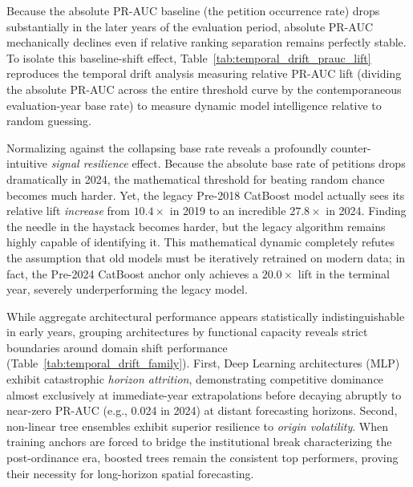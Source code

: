 \documentclass[11pt, letterpaper, oneside]{article}
\begin{document}
\vspace{1em}


\noindent Because the absolute PR-AUC baseline (the petition occurrence rate) drops substantially in the later years of the evaluation period, absolute PR-AUC mechanically declines even if relative ranking separation remains perfectly stable. To isolate this baseline-shift effect, Table~\ref{tab:temporal_drift_prauc_lift} reproduces the temporal drift analysis measuring relative PR-AUC lift (dividing the absolute PR-AUC across the entire threshold curve by the contemporaneous evaluation-year base rate) to measure dynamic model intelligence relative to random guessing.



Normalizing against the collapsing base rate reveals a profoundly counter-intuitive \textit{signal resilience} effect. Because the absolute base rate of petitions drops dramatically in 2024, the mathematical threshold for beating random chance becomes much harder. Yet, the legacy Pre-2018 CatBoost model actually sees its relative lift \textit{increase} from $10.4\times$ in 2019 to an incredible $27.8\times$ in 2024. Finding the needle in the haystack becomes harder, but the legacy algorithm remains highly capable of identifying it. This mathematical dynamic completely refutes the assumption that old models must be iteratively retrained on modern data; in fact, the Pre-2024 CatBoost anchor only achieves a $20.0\times$ lift in the terminal year, severely underperforming the legacy model.

\vspace{1em}
While aggregate architectural performance appears statistically indistinguishable in early years, grouping architectures by functional capacity reveals strict boundaries around domain shift performance (Table~\ref{tab:temporal_drift_family}). First, Deep Learning architectures (MLP) exhibit catastrophic \textit{horizon attrition}, demonstrating competitive dominance almost exclusively at immediate-year extrapolations before decaying abruptly to near-zero PR-AUC (e.g., 0.024 in 2024) at distant forecasting horizons. Second, non-linear tree ensembles exhibit superior resilience to \textit{origin volatility}. When training anchors are forced to bridge the institutional break characterizing the post-ordinance era, boosted trees remain the consistent top performers, proving their necessity for long-horizon spatial forecasting.
\end{document}
